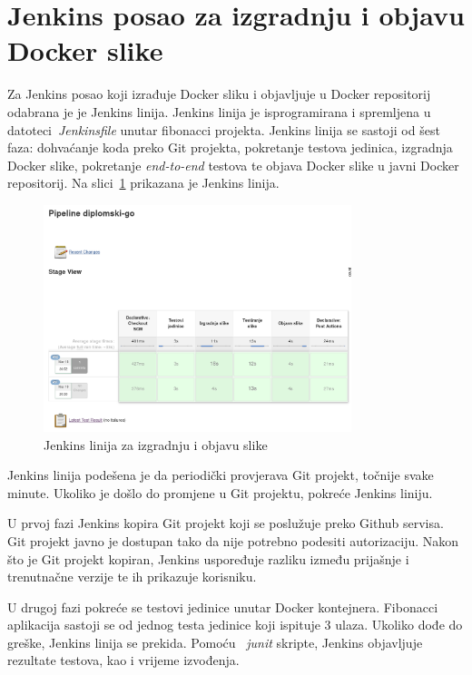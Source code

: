\section{Jenkins posao za izgradnju i objavu Docker slike}
Za Jenkins posao koji izrađuje Docker sliku i objavljuje u Docker repositorij odabrana je je Jenkins
linija. Jenkins linija je isprogramirana i spremljena u datoteci~\textit{Jenkinsfile} unutar
fibonacci projekta. Jenkins linija se sastoji od šest faza: dohvaćanje koda preko Git projekta,
pokretanje testova jedinica, izgradnja Docker slike, pokretanje \textit{end-to-end} testova te
objava Docker slike u javni Docker repositorij. Na slici~\ref{fig:03jenkins_pipeline} prikazana je
Jenkins linija.

\begin{figure}[h]
    \centering
    \includegraphics[width=0.8\textwidth]{img/03/jenkins_pipeline.png}
    \caption{Jenkins linija za izgradnju i objavu slike}%
    \label{fig:03jenkins_pipeline}
\end{figure}

Jenkins linija podešena je da periodički provjerava Git projekt, točnije svake minute. Ukoliko je
došlo do promjene u Git projektu, pokreće Jenkins liniju.

U prvoj fazi Jenkins kopira Git projekt koji se poslužuje preko Github servisa. Git projekt javno je
dostupan tako da nije potrebno podesiti autorizaciju. Nakon što je Git projekt kopiran, Jenkins
uspoređuje razliku između prijašnje i trenutnačne verzije te ih prikazuje korisniku.

U drugoj fazi pokreće se testovi jedinice unutar Docker kontejnera. Fibonacci aplikacija sastoji se
od jednog testa jedinice koji ispituje 3 ulaza. Ukoliko dođe do greške, Jenkins linija se prekida.
Pomoću ~\textit{junit} skripte, Jenkins objavljuje rezultate testova, kao i vrijeme izvođenja.

